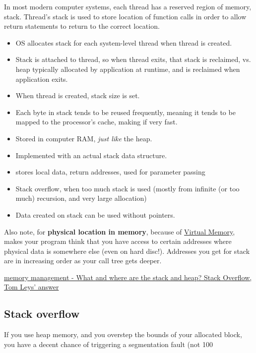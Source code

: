 \documentclass[10pt]{amsart}
\begin{document}
In most modern computer systems, each thread has a reserved region of memory, stack.  Thread's stack is used to store location of function calls in order to allow return statements to return to the correct location.  

\begin{itemize}
	\item OS allocates stack for each system-level thread when thread is created.  
	\item Stack is attached to thread, so when thread exits, that stack is reclaimed, vs. heap typically allocated by application at runtime, and is reclaimed when application exits.  
	\item When thread is created, stack size is set.  
	\item Each byte in stack tends to be reused frequently, meaning it tends to be mapped to the processor's cache, making if very fast.  
	\item Stored in computer RAM, \emph{just like} the heap.  
	\item Implemented with an actual stack data structure.  
	\item stores local data, return addresses, used for parameter passing  
	\item Stack overflow, when too much stack is used (mostly from infinite (or too much) recursion, and very large allocation)
	\item Data created on stack can be used without pointers.  
\end{itemize}

Also note, for \textbf{physical location in memory}, because of \href{http://en.wikipedia.org/wiki/Virtual_memory}{Virtual Memory}, makes your program think that you have access to certain addresses where physical data is somewhere else (even on hard disc!).  Addresses you get for stack are in increasing order as your call tree gets deeper.  

\href{http://stackoverflow.com/questions/79923/what-and-where-are-the-stack-and-heap/79988#79988}{memory management - What and where are the stack and heap? Stack Overflow, Tom Leys' answer}

\subsection{Stack overflow}  

If you use heap memory, and you overstep the bounds of your allocated block, you have a decent chance of triggering a segmentation fault (not 100%
\end{document}
